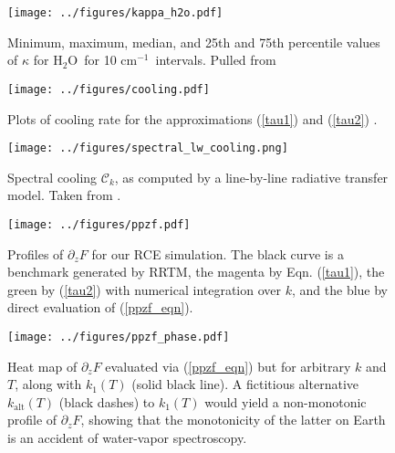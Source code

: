 \documentclass[10pt]{article}
\newcommand{\eqnref}[1]{(\ref{#1})}
\newcommand{\ppz}{\ensuremath{\partial_z}}
\newcommand{\htwo}{\ensuremath{\mathrm{H_2O}}}
\newcommand{\FLW}{\ensuremath{F}}
\newcommand{\cool}{\ensuremath{\mathcal{C}}}
\newcommand{\cminverse}{\ensuremath{\mathrm{cm^{-1}}}}
\begin{document}
\begin{figure}[h]
	\begin{center}
			\texttt{[image: ../figures/kappa\_h2o.pdf]}
		\caption{Minimum, maximum, median, and 25th and 75th percentile values of $\kappa$ for \htwo\ for 10 \cminverse\ intervals. Pulled from \cite{pierrehumbert2010}
		\label{kappa_h2o}
		}
	\end{center}
\end{figure}

\begin{figure}[h]
	\begin{center}
			\texttt{[image: ../figures/cooling.pdf]}
		\caption{Plots of cooling rate for the approximations  \eqnref{tau1} and \eqnref{tau2} .
		\label{cooling_fig}
		}
	\end{center}
\end{figure}

\begin{figure}[h]
	\begin{center}
			\texttt{[image: ../figures/spectral\_lw\_cooling.png]}
		\caption{Spectral cooling $\cool_k$, as computed by a line-by-line radiative transfer model. Taken from \cite{huang2013}.
		\label{lbl_cooling}
		}
	\end{center}
\end{figure}

\begin{figure}[h]
	\begin{center}
			\texttt{[image: ../figures/ppzf.pdf]}
		\caption{Profiles of $\ppz \FLW$ for our RCE simulation. The black curve is a benchmark generated by RRTM, the magenta by Eqn. \eqnref{tau1}, the green by \eqnref{tau2} with numerical integration over $k$, and the blue by direct evaluation of \eqnref{ppzf_eqn}.
		\label{ppzf}
		}
	\end{center}
\end{figure}

\begin{figure}[h]
	\begin{center}
			\texttt{[image: ../figures/ppzf\_phase.pdf]}
		\caption{Heat map of  $\ppz F$ evaluated via \eqnref{ppzf_eqn} but for arbitrary $k$ and $T$, along with $k_1(T)$ (solid black line). A fictitious alternative $k_{\mathrm{alt}}(T)$ (black dashes) to $k_1(T)$  would yield a non-monotonic profile of $\ppz F$, showing that the monotonicity of the latter on Earth is an accident of water-vapor spectroscopy.
		\label{ppzf_phase}
		}
	\end{center}
\end{figure}
\end{document}
